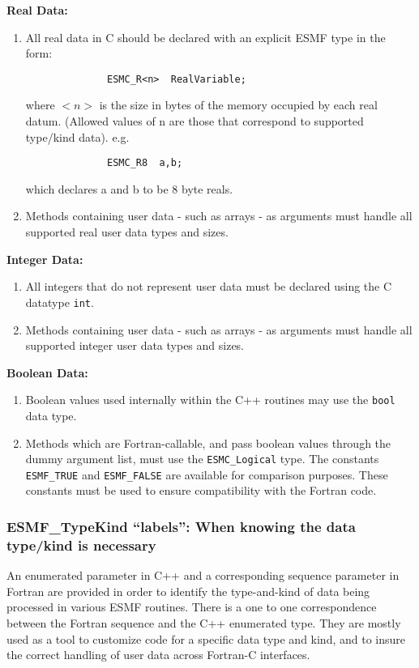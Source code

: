 {\bf Real Data:}
\begin{enumerate}
\item All real data in C should be declared with an explicit ESMF type in the form:
\begin{verbatim}
              ESMC_R<n>  RealVariable;
\end{verbatim}
      where $<n>$ is the size in bytes of the memory occupied by each real datum. (Allowed values of n are those that correspond to supported type/kind data). e.g.
\begin{verbatim}
              ESMC_R8  a,b;
\end{verbatim}
      which declares a and b to be 8 byte reals.

\item Methods containing user data - such as arrays - as arguments must handle all supported real user data types and sizes.
\end{enumerate}

{\bf Integer Data:}
\begin{enumerate}
\item All integers that do not represent user data must be declared using the C datatype {\tt int}.

\item Methods containing user data - such as arrays - as arguments must handle all supported integer user data types and sizes.
\end{enumerate}

{\bf Boolean Data:}
\begin{enumerate}
\item Boolean values used internally within the C++ routines may use the {\tt bool} data type.

\item Methods which are Fortran-callable, and pass boolean values through the dummy argument list, must use the {\tt ESMC\_Logical} type.  The constants
{\tt ESMF\_TRUE} and {\tt ESMF\_FALSE} are available for comparison purposes.  These constants must be used to ensure compatibility with the Fortran code.
\end{enumerate}

\subsubsection{ESMF\_TypeKind ``labels'': When knowing the data type/kind is necessary}

An enumerated parameter in C++ and a corresponding sequence parameter in Fortran are provided in order to identify the type-and-kind of data being processed in various ESMF routines. There is a one to one correspondence between the Fortran sequence and the C++ enumerated type. They are mostly used as a tool to customize code for a specific data type and kind, and to insure the correct handling of user data across Fortran-C interfaces.

